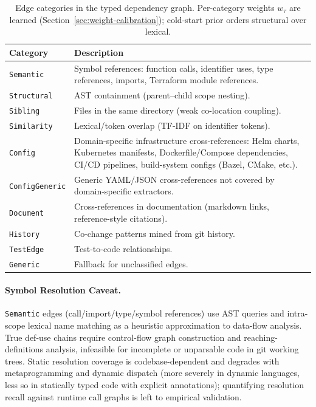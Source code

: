 \documentclass[11pt, a4paper]{article}
\begin{document}
\begin{table}[h]
\centering
\small
\begin{tabular}{lp{8cm}}
\toprule
\textbf{Category} & \textbf{Description} \\
\midrule
\texttt{Semantic}      & Symbol references: function calls, identifier uses, type references, imports, Terraform module references. \\
\texttt{Structural}    & AST containment (parent--child scope nesting). \\
\texttt{Sibling}       & Files in the same directory (weak co-location coupling). \\
\texttt{Similarity}    & Lexical/token overlap (TF-IDF on identifier tokens). \\
\texttt{Config}        & Domain-specific infrastructure cross-references: Helm charts, Kubernetes manifests, Dockerfile/Compose dependencies, CI/CD pipelines, build-system configs (Bazel, CMake, etc.). \\
\texttt{ConfigGeneric} & Generic YAML/JSON cross-references not covered by domain-specific extractors. \\
\texttt{Document}      & Cross-references in documentation (markdown links, reference-style citations). \\
\texttt{History}       & Co-change patterns mined from git history. \\
\texttt{TestEdge}      & Test-to-code relationships. \\
\texttt{Generic}       & Fallback for unclassified edges. \\
\bottomrule
\end{tabular}
\caption{Edge categories in the typed dependency graph. Per-category weights $w_\tau$ are learned (Section~\ref{sec:weight-calibration}); cold-start prior orders structural over lexical.}
\label{tab:edge-categories}
\end{table}

\paragraph{Symbol Resolution Caveat.} \texttt{Semantic} edges (call/import/type/symbol references) use AST queries and intra-scope lexical name matching as a heuristic approximation to data-flow analysis. True def-use chains require control-flow graph construction and reaching-definitions analysis, infeasible for incomplete or unparsable code in git working trees. Static resolution coverage is codebase-dependent and degrades with metaprogramming and dynamic dispatch (more severely in dynamic languages, less so in statically typed code with explicit annotations); quantifying resolution recall against runtime call graphs is left to empirical validation.
\end{document}
